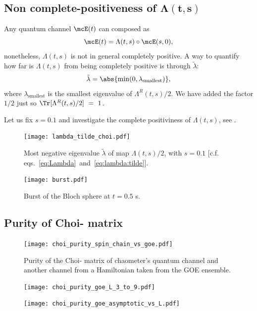 \subsection{Non complete-positiveness of $\boldsymbol{\Lambda(t, s)}$}
Any quantum channel $\mcE(t)$ can composed as 
\begin{equation}\label{eq:Lambda}
\mcE(t) = 
\Lambda(t,s) \circ \mcE(s, 0),
\end{equation}
nonetheless, $\Lambda(t,s)$ is not in general completely positive. A way to 
quantify how far is $\Lambda(t,s)$ from being completely positive is through 
$\tilde \lambda$:
\begin{equation}\label{eq:lambda:tilde}
\tilde \lambda = 
\abs{\min(0, \lambda_{\text{smallest}})},
\end{equation}
where $\lambda_{\text{smallest}}$ is the smallest eigenvalue of 
$\Lambda^R(t,s)/2$. We have added the factor $1/2$ just so 
$\Tr[\Lambda^R(t,s)/2]~=~1$.

Let us fix $s=0.1$ and investigate the complete positiviness of 
$\Lambda(t, s)$, see .

\begin{figure}
\centering
\texttt{[image: lambda\_tilde\_choi.pdf]}
\caption{Most negative eigenvalue $\tilde \lambda$ of map $\Lambda(t,s)/2$, 
with $s=0.1$ [c.f. eqs.~\eqref{eq:Lambda}~and~\eqref{eq:lambda:tilde}].}
\label{fig:lambda:tilde:Choi-\jami{}}
\end{figure}

\begin{figure}
\centering
\texttt{[image: burst.pdf]}
\caption{Burst of the Bloch sphere at $t=0.5$ s.}
\label{fig:burst}
\end{figure}

\subsection{Purity of Choi-\jami{} matrix}
\begin{figure}
\centering
\texttt{[image: choi\_purity\_spin\_chain\_vs\_goe.pdf]}
\caption{Purity of the Choi-\jami{} matrix of chaometer's quantum channel and 
another channel from a Hamiltonian taken from the GOE ensemble.}
\label{fig:choi:purity:spin:chain:vs:goe}
\end{figure}


\begin{figure}
\centering
\texttt{[image: choi\_purity\_goe\_L\_3\_to\_9.pdf]}
\caption{
}
\end{figure}
\begin{figure}
\centering
\texttt{[image: choi\_purity\_goe\_asymptotic\_vs\_L.pdf]}
\caption{
}
\end{figure}